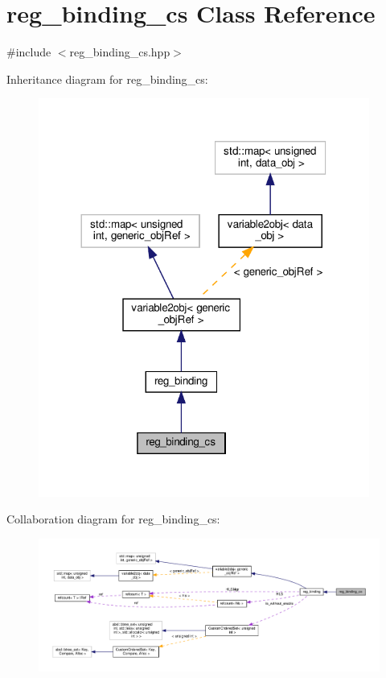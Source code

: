 \hypertarget{classreg__binding__cs}{}\section{reg\+\_\+binding\+\_\+cs Class Reference}
\label{classreg__binding__cs}


{\ttfamily \#include $<$reg\+\_\+binding\+\_\+cs.\+hpp$>$}



Inheritance diagram for reg\+\_\+binding\+\_\+cs\+:
\nopagebreak
\begin{figure}[H]
\begin{center}
\leavevmode
\includegraphics[width=308pt]{d1/d0c/classreg__binding__cs__inherit__graph}
\end{center}
\end{figure}


Collaboration diagram for reg\+\_\+binding\+\_\+cs\+:
\nopagebreak
\begin{figure}[H]
\begin{center}
\leavevmode
\includegraphics[width=350pt]{d0/d7d/classreg__binding__cs__coll__graph}
\end{center}
\end{figure}

